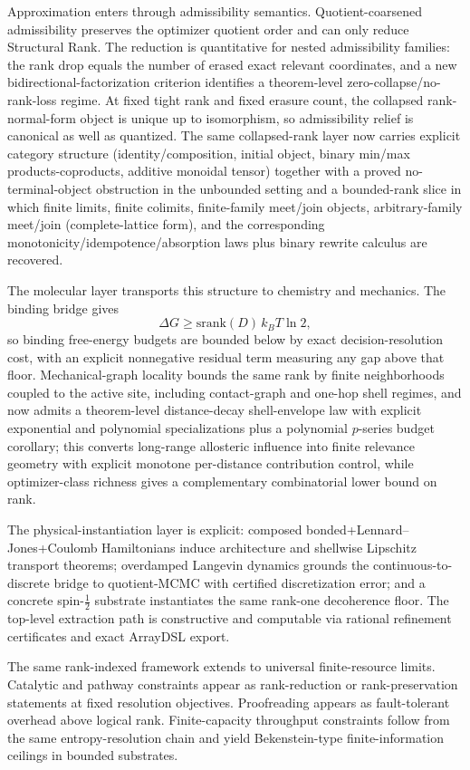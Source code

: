 Approximation enters through admissibility semantics. Quotient-coarsened admissibility preserves the optimizer quotient order and can only reduce Structural Rank. The reduction is quantitative for nested admissibility families: the rank drop equals the number of erased exact relevant coordinates, and a new bidirectional-factorization criterion identifies a theorem-level zero-collapse/no-rank-loss regime. At fixed tight rank and fixed erasure count, the collapsed rank-normal-form object is unique up to isomorphism, so admissibility relief is canonical as well as quantized. The same collapsed-rank layer now carries explicit category structure (identity/composition, initial object, binary min/max products-coproducts, additive monoidal tensor) together with a proved no-terminal-object obstruction in the unbounded setting and a bounded-rank slice in which finite limits, finite colimits, finite-family meet/join objects, arbitrary-family meet/join (complete-lattice form), and the corresponding monotonicity/idempotence/absorption laws plus binary rewrite calculus are recovered.

The molecular layer transports this structure to chemistry and mechanics. The binding bridge gives
\[
\Delta G \ge \mathrm{srank}(D)\,k_B T\ln 2,
\]
so binding free-energy budgets are bounded below by exact decision-resolution cost, with an explicit nonnegative residual term measuring any gap above that floor. Mechanical-graph locality bounds the same rank by finite neighborhoods coupled to the active site, including contact-graph and one-hop shell regimes, and now admits a theorem-level distance-decay shell-envelope law with explicit exponential and polynomial specializations plus a polynomial $p$-series budget corollary; this converts long-range allosteric influence into finite relevance geometry with explicit monotone per-distance contribution control, while optimizer-class richness gives a complementary combinatorial lower bound on rank.

The physical-instantiation layer is explicit: composed bonded+Lennard--Jones+Coulomb Hamiltonians induce architecture and shellwise Lipschitz transport theorems; overdamped Langevin dynamics grounds the continuous-to-discrete bridge to quotient-MCMC with certified discretization error; and a concrete spin-$\tfrac12$ substrate instantiates the same rank-one decoherence floor. The top-level extraction path is constructive and computable via rational refinement certificates and exact ArrayDSL export.

The same rank-indexed framework extends to universal finite-resource limits. Catalytic and pathway constraints appear as rank-reduction or rank-preservation statements at fixed resolution objectives. Proofreading appears as fault-tolerant overhead above logical rank. Finite-capacity throughput constraints follow from the same entropy-resolution chain and yield Bekenstein-type finite-information ceilings in bounded substrates.

